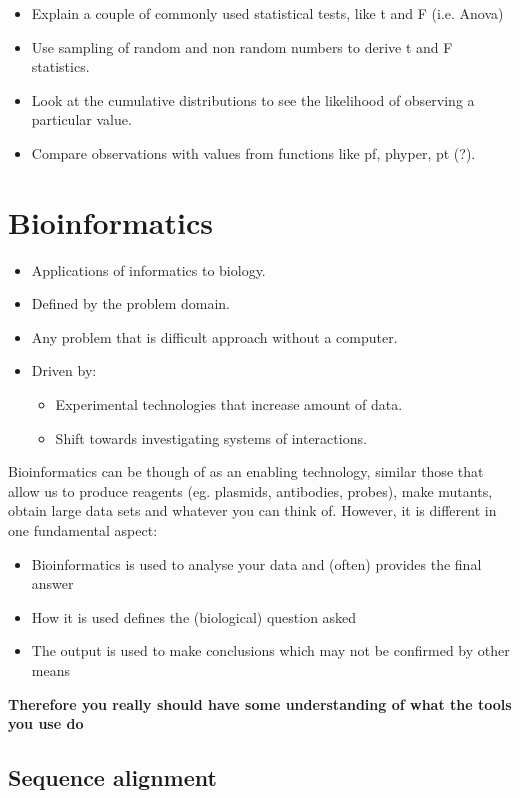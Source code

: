 \documentclass{scrartcl}
\begin{document}
\begin{itemize}
\item Explain a couple of commonly used statistical tests, like
  t and F (i.e. Anova)
\item Use sampling of random and non random numbers to derive t
  and F statistics.
\item Look at the cumulative distributions to see the likelihood of
  observing a particular value.
\item Compare observations with values from functions like pf, phyper,
  pt (?).
\end{itemize}
\section{Bioinformatics}
\label{sec-4}

\begin{itemize}
\item Applications of informatics to biology.
\item Defined by the problem domain.
\item Any problem that is difficult approach without a computer.
\item Driven by:
\begin{itemize}
\item Experimental technologies that increase amount of data.
\item Shift towards investigating systems of interactions.
\end{itemize}
\end{itemize}

Bioinformatics can be though of as an enabling technology, similar those
that allow us to produce reagents (eg. plasmids, antibodies, probes), make mutants,
obtain large data sets and whatever you can think of. However, it is different in one fundamental aspect:
\begin{itemize}
\item Bioinformatics is used to analyse your data and (often) provides the final answer
\item How it is used defines the (biological) question asked
\item The output is used to make conclusions which may not be confirmed by other means
\end{itemize}

\textbf{Therefore you really should have some understanding of what the tools you use do}
\subsection{Sequence alignment}
\label{sec-4-1}
\end{document}
